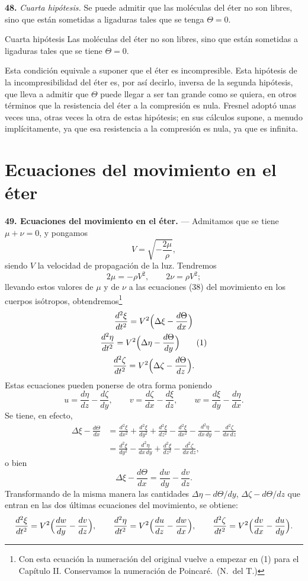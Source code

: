 \noindent\textbf{48.} \emph{Cuarta hipótesis.} Se puede admitir que las
moléculas del éter no son libres, sino que están sometidas a ligaduras
tales que se tenga $\Theta=0$.

\begin{enunciado}{Cuarta hipótesis}
Las moléculas del éter no son libres, sino que están sometidas a
ligaduras tales que se tiene $\Theta=0$.
\end{enunciado}

Esta condición equivale a suponer que el éter es incompresible. Esta
hipótesis de la incompresibilidad del éter es, por así decirlo, inversa
de la segunda hipótesis, que lleva a admitir que $\Theta$ puede llegar a
ser tan grande como se quiera, en otros términos que la resistencia del
éter a la compresión es nula. Fresnel adoptó unas veces una, otras veces
la otra de estas hipótesis; en sus cálculos supone, a menudo
implícitamente, ya que esa resistencia a la compresión es nula, ya que es
infinita.

\section{Ecuaciones del movimiento en el éter}

\noindent\textbf{49. Ecuaciones del movimiento en el éter.} — Admitamos
que se tiene $\mu+\nu=0$, y pongamos
\[
V=\sqrt{-\frac{2\mu}{\rho}},
\]
siendo $V$ la velocidad de propagación de la luz. Tendremos
\[
2\mu=-\rho V^2,\qquad 2\nu=\rho V^2;
\]
llevando estos valores de $\mu$ y de $\nu$ a las ecuaciones (38) del
movimiento en los cuerpos isótropos, obtendremos\footnote{Con esta
ecuación la numeración del original vuelve a empezar en (1) para el
Capítulo II. Conservamos la numeración de Poincaré.~(N.~del T.)}
\begin{gather}
\frac{d^2\xi}{dt^2} = V^2\Bigl(\Delta\xi-\frac{d\Theta}{dx}\Bigr)\notag\\
\frac{d^2\eta}{dt^2} = V^2\Bigl(\Delta\eta-\frac{d\Theta}{dy}\Bigr)\tag{1}\\
\frac{d^2\zeta}{dt^2} = V^2\Bigl(\Delta\zeta-\frac{d\Theta}{dz}\Bigr).\notag
\end{gather}
Estas ecuaciones pueden ponerse de otra forma poniendo
\[
u=\frac{d\eta}{dz}-\frac{d\zeta}{dy},\qquad
v=\frac{d\zeta}{dx}-\frac{d\xi}{dz},\qquad
w=\frac{d\xi}{dy}-\frac{d\eta}{dx}.
\]
Se tiene, en efecto,
\begin{align*}
\Delta\xi-\frac{d\Theta}{dx}
&= \frac{d^2\xi}{dx^2}+\frac{d^2\xi}{dy^2}+\frac{d^2\xi}{dz^2}
-\frac{d^2\xi}{dx^2}-\frac{d^2\eta}{dx\,dy}-\frac{d^2\zeta}{dx\,dz}\\
&= \frac{d^2\xi}{dy^2}-\frac{d^2\eta}{dx\,dy}
+\frac{d^2\xi}{dz^2}-\frac{d^2\zeta}{dx\,dz},
\end{align*}
o bien
\[
\Delta\xi-\frac{d\Theta}{dx} = \frac{dw}{dy}-\frac{dv}{dz}.
\]
Transformando de la misma manera las cantidades
$\Delta\eta-d\Theta/dy$, $\Delta\zeta-d\Theta/dz$ que entran en las dos
últimas ecuaciones del movimiento, se obtiene:
\[
\frac{d^2\xi}{dt^2} = V^2\Bigl(\frac{dw}{dy}-\frac{dv}{dz}\Bigr),\qquad
\frac{d^2\eta}{dt^2} = V^2\Bigl(\frac{du}{dz}-\frac{dw}{dx}\Bigr),\qquad
\frac{d^2\zeta}{dt^2} = V^2\Bigl(\frac{dv}{dx}-\frac{du}{dy}\Bigr).
\]

